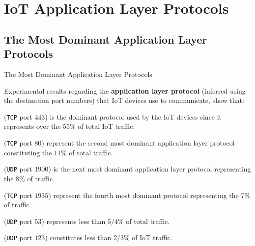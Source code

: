 \documentclass[10pt]{beamer}
\begin{document}
\section{IoT Application Layer Protocols}
\subsection{The Most Dominant Application Layer Protocols}
\begin{frame}{The Most Dominant Application Layer Protocols}

Experimental results regarding the \textbf{application layer protocol} (inferred using the destination port numbers) that IoT devices use to communicate, show that:

\begin{description}
\justifying

\item[\texttt{HTTPS}] (\texttt{TCP} port $443$) is the dominant protocol used by the IoT devices since it represents over the $55\%$ of total IoT traffic.

\item[\texttt{HTTP}] (\texttt{TCP} port $80$) represent the second most dominant application layer protocol constituting the $11\%$ of total traffic.

\item[\texttt{SSDP}] (\texttt{UDP} port $1900$) is the next most dominant application layer protocol representing the $8\%$ of traffic.

\item[\texttt{RTMP}] (\texttt{TCP} port $1935$) represent the fourth most dominant protocol representing the $7\%$ of traffic

\item[\texttt{DNS}] (\texttt{UDP} port $53$) represents less than $5/4\%$ of total traffic.

\item[\texttt{NTP}] (\texttt{UDP} port $123$) constitutes less than $2/3\%$ of IoT traffic.

\end{description}

\end{frame} 
\end{document}
